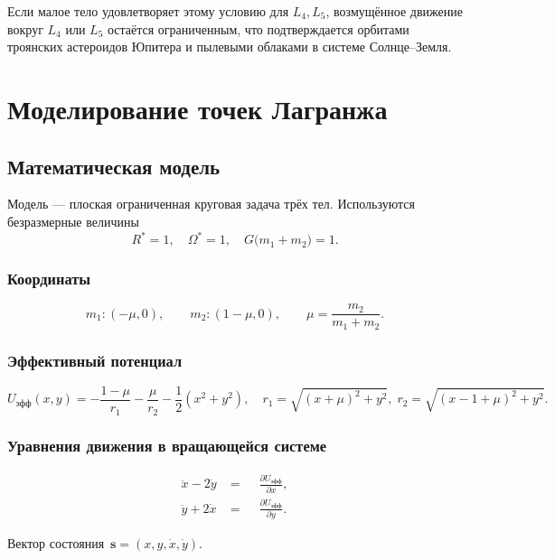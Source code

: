 \documentclass[12pt]{article}
\begin{document}
Если малое тело удовлетворяет этому условию для $L_4,L_5$, возмущённое движение вокруг $L_4$ или $L_5$ остаётся ограниченным, что подтверждается орбитами троянских астероидов Юпитера и пылевыми облаками в системе Солнце–Земля.

\section{Моделирование точек Лагранжа}\label{sec:model}

\subsection{Математическая модель}

Модель --- плоская ограниченная круговая задача трёх тел.
Используются безразмерные величины
\[
R^{*}=1,\quad \Omega^{*}=1,\quad G\bigl(m_1+m_2\bigr)=1 .
\]

\subsubsection{Координаты}

\[
m_1 : (-\mu,0),\qquad
m_2 : (1-\mu,0),\qquad
\mu=\frac{m_2}{m_1+m_2}.
\]

\subsubsection{Эффективный потенциал}

\[
U_{\mathrm{эфф}}(x,y)=
-\frac{1-\mu}{r_1}-\frac{\mu}{r_2}-\frac12(x^2+y^2),
\quad
r_1=\sqrt{(x+\mu)^2+y^2},\;
r_2=\sqrt{(x-1+\mu)^2+y^2}.
\]

\subsubsection{Уравнения движения в вращающейся системе}

\[
\begin{aligned}
\ddot x - 2\dot y &= \phantom{-}\frac{\partial U_{\mathrm{эфф}}}{\partial x},\\
\ddot y + 2\dot x &= \phantom{-}\frac{\partial U_{\mathrm{эфф}}}{\partial y}.
\end{aligned}
\tag{1}
\]

Вектор состояния\
\(\mathbf s=(x,y,\dot x,\dot y)\).
\end{document}

